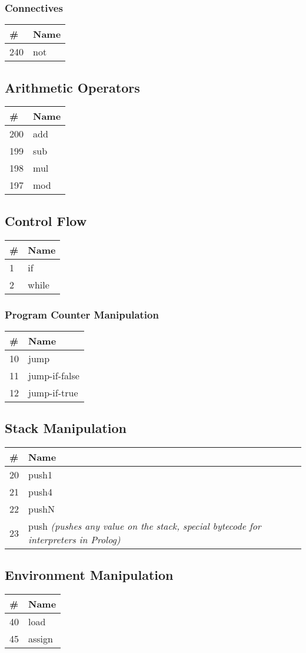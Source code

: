 \documentclass{article}
\begin{document}
\subsubsection{Connectives}

\begin{tabular}{l|l}
\# & Name \\ \hline
240 & not\\ \hline
\end{tabular}


\subsection{Arithmetic Operators}

\begin{tabular}{l|l}
\# & Name \\ \hline
200 & add \\ \hline
199 & sub \\ \hline
198 & mul \\ \hline
197 & mod \\ \hline
\end{tabular}

\subsection{Control Flow}

\begin{tabular}{l|l}
\# & Name \\ \hline
1 & if \\ \hline
2 & while \\ \hline
\end{tabular}

\subsubsection{Program Counter Manipulation}
\begin{tabular}{l|l}
\# & Name \\ \hline
10 & jump \\ \hline
11 & jump-if-false \\ \hline
12 & jump-if-true \\ \hline
\end{tabular}

\subsection{Stack Manipulation}
\begin{tabular}{l|l}
\# & Name \\ \hline
20 & push1 \\ \hline
21 & push4 \\ \hline
22 & pushN \\ \hline
23 & push \textit{(pushes any value on the stack, special bytecode for interpreters in Prolog)} \\ \hline
\end{tabular}

\subsection{Environment Manipulation}
\begin{tabular}{l|l}
\# & Name \\ \hline
40 & load \\ \hline
45 & assign \\ \hline

\end{tabular}
\end{document}
